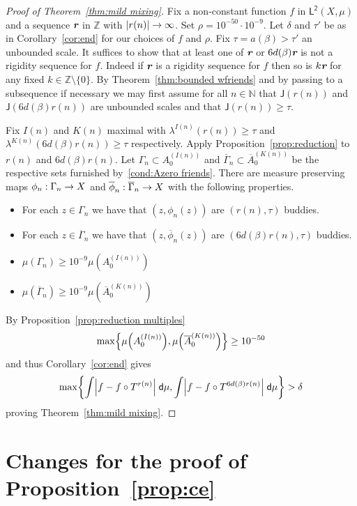 \documentclass[AHL,Unicode,longabstracts,published]{cedram}
\newcommand{\N}{\mathbb{N}}
\newcommand{\Z}{\mathbb{Z}}
\newcommand{\intd}{\;\mathsf{d}}
\newcommand{\lp}{\mathsf{L}}
\newcommand{\ltwo}{\lp^{\!\mathsf{2}}}
\newcommand{\scl}{\mathsf{J}}
\def\mathbi#1{\textbf{\em #1}}
\newcommand{\bir}{\mathbi{r}}
\let\originalleft\left
\let\originalright\right
\renewcommand{\left}{\mathopen{}\mathclose\bgroup\originalleft}
\renewcommand{\right}{\aftergroup\egroup\originalright}
\renewcommand*{\to}{\mathchoice{\longrightarrow}{\rightarrow}{\rightarrow}{\rightarrow}}
\begin{document}
\begin{proof}[Proof of Theorem~\ref{thm:mild mixing}]
Fix a non-constant function $f$ in $\ltwo(X,\mu)$ and a sequence $ \bir$ in $\Z$ with $|r(n)| \to \infty$. Set $\rho=10^{-50}\cdot 10^{-9}$. Let $\delta$ and $\tau'$ be as in Corollary~\ref{cor:end} for our choices of $f$ and $\rho$. Fix $\tau = a(\beta) > \tau'$ an unbounded scale. It suffices to show that at least one of $ \bir$ or $6 d(\beta)  \bir$ is not a rigidity sequence for $f$. Indeed if $ \bir$ is a rigidity sequence for $f$ then so is $k  \bir$ for any fixed $k \in
\Z\setminus \{0\}$. By Theorem~\ref{thm:bounded wfriends} and by passing to a subsequence if necessary we may first assume for all $n \in \N$ that $\scl(r(n))$ and $\scl(6d(\beta) r(n))$ are unbounded scales and that $\scl(r(n)) \ge \tau$.

Fix $I(n)$ and $K(n)$ maximal with $\lambda^{I(n)}(r(n)) \ge \tau$ and $\lambda^{K(n)}(6d(\beta) r(n)) \ge \tau$ respectively. Apply Proposition~\ref{prop:reduction} to $r(n)$ and $6 d(\beta) r(n)$. Let $\Gamma_n \subset A^{(I(n))}_0$ and $\overline{\Gamma}_n \subset
\overline{A}^{(K(n))}_0$ be the respective sets furnished by~\eqref{cond:Azero friends}. There are measure preserving maps $\phi_n : \Gamma_n \to X$ and $\overline{\phi}_n : \overline{\Gamma}_n \to X$ with the following properties.
\begin{itemize}
\item For each $z \in \Gamma_n$ we have that $(z,\phi_n(z))$ are $(r(n),\tau)$ buddies.
\item For each $z \in \overline{\Gamma}_n$ we have that $(z,\overline{\phi}_n(z))$ are $(6d(\beta)r(n),\tau)$ buddies.
\item $\mu(\Gamma_n) \ge 10^{-9}\mu(A^{(I(n))}_0)$
\item $\mu(\overline{\Gamma}_n) \ge 10^{-9}\mu(\overline{A}^{(K(n))}_0)$
\end{itemize}
By Proposition~\ref{prop:reduction multiples}
\[
\max\left\{\mu\left(A^{(I(n))}_0\right), \mu\left(\overline{A}^{(K(n))}_0\right) \right\} \geq 10^{-50}
\]
and thus Corollary~\ref{cor:end} gives
\[
\max \left\{ \int \left|f-f\circ T^{r(n)}\right| \intd \mu,\int \left|f-f \circ T^{6d(\beta)r(n)}\right| \intd\mu \right\} > \delta
\]
proving Theorem~\ref{thm:mild mixing}.
\end{proof}



\appendix

\section{Changes for the proof of Proposition~\ref{prop:ce}}\label{app:ce_proof}
\end{document}
